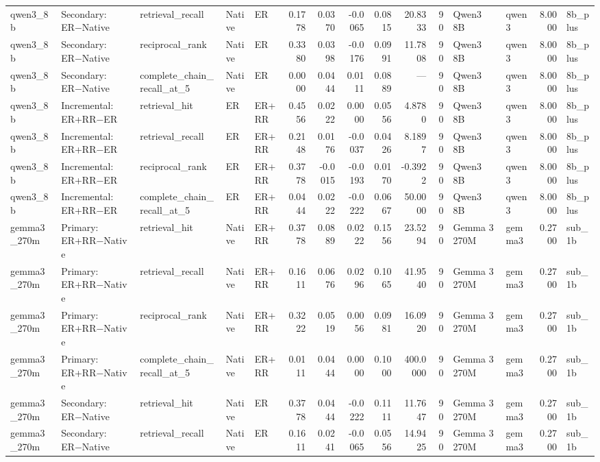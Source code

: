 \begin{tabular}{lllllrrrrrrllrl}
qwen3_8b & Secondary: ER−Native & retrieval_recall & Native & ER & 0.1778 & 0.0370 & -0.0065 & 0.0815 & 20.8333 & 90 & Qwen3 8B & qwen3 & 8.0000 & 8b_plus \\
qwen3_8b & Secondary: ER−Native & reciprocal_rank & Native & ER & 0.3380 & 0.0398 & -0.0176 & 0.0991 & 11.7808 & 90 & Qwen3 8B & qwen3 & 8.0000 & 8b_plus \\
qwen3_8b & Secondary: ER−Native & complete_chain_recall_at_5 & Native & ER & 0.0000 & 0.0444 & 0.0111 & 0.0889 & — & 90 & Qwen3 8B & qwen3 & 8.0000 & 8b_plus \\
qwen3_8b & Incremental: ER+RR−ER & retrieval_hit & ER & ER+RR & 0.4556 & 0.0222 & 0.0000 & 0.0556 & 4.8780 & 90 & Qwen3 8B & qwen3 & 8.0000 & 8b_plus \\
qwen3_8b & Incremental: ER+RR−ER & retrieval_recall & ER & ER+RR & 0.2148 & 0.0176 & -0.0037 & 0.0426 & 8.1897 & 90 & Qwen3 8B & qwen3 & 8.0000 & 8b_plus \\
qwen3_8b & Incremental: ER+RR−ER & reciprocal_rank & ER & ER+RR & 0.3778 & -0.0015 & -0.0193 & 0.0170 & -0.3922 & 90 & Qwen3 8B & qwen3 & 8.0000 & 8b_plus \\
qwen3_8b & Incremental: ER+RR−ER & complete_chain_recall_at_5 & ER & ER+RR & 0.0444 & 0.0222 & -0.0222 & 0.0667 & 50.0000 & 90 & Qwen3 8B & qwen3 & 8.0000 & 8b_plus \\
gemma3_270m & Primary: ER+RR−Native & retrieval_hit & Native & ER+RR & 0.3778 & 0.0889 & 0.0222 & 0.1556 & 23.5294 & 90 & Gemma 3 270M & gemma3 & 0.2700 & sub_1b \\
gemma3_270m & Primary: ER+RR−Native & retrieval_recall & Native & ER+RR & 0.1611 & 0.0676 & 0.0296 & 0.1065 & 41.9540 & 90 & Gemma 3 270M & gemma3 & 0.2700 & sub_1b \\
gemma3_270m & Primary: ER+RR−Native & reciprocal_rank & Native & ER+RR & 0.3222 & 0.0519 & 0.0056 & 0.0981 & 16.0920 & 90 & Gemma 3 270M & gemma3 & 0.2700 & sub_1b \\
gemma3_270m & Primary: ER+RR−Native & complete_chain_recall_at_5 & Native & ER+RR & 0.0111 & 0.0444 & 0.0000 & 0.1000 & 400.0000 & 90 & Gemma 3 270M & gemma3 & 0.2700 & sub_1b \\
gemma3_270m & Secondary: ER−Native & retrieval_hit & Native & ER & 0.3778 & 0.0444 & -0.0222 & 0.1111 & 11.7647 & 90 & Gemma 3 270M & gemma3 & 0.2700 & sub_1b \\
gemma3_270m & Secondary: ER−Native & retrieval_recall & Native & ER & 0.1611 & 0.0241 & -0.0065 & 0.0556 & 14.9425 & 90 & Gemma 3 270M & gemma3 & 0.2700 & sub_1b \\

\end{tabular}
